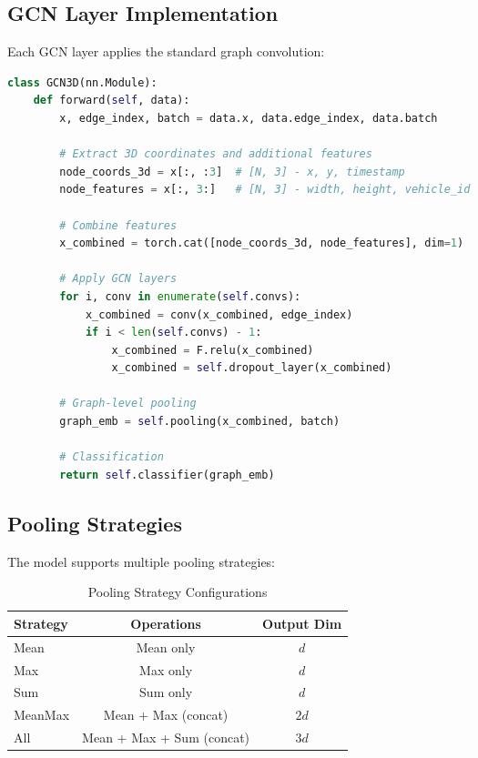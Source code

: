 \subsection{GCN Layer Implementation}

Each GCN layer applies the standard graph convolution:

\begin{lstlisting}[language=Python, caption={GCN layer forward pass}]
class GCN3D(nn.Module):
    def forward(self, data):
        x, edge_index, batch = data.x, data.edge_index, data.batch
        
        # Extract 3D coordinates and additional features
        node_coords_3d = x[:, :3]  # [N, 3] - x, y, timestamp
        node_features = x[:, 3:]   # [N, 3] - width, height, vehicle_id
        
        # Combine features
        x_combined = torch.cat([node_coords_3d, node_features], dim=1)
        
        # Apply GCN layers
        for i, conv in enumerate(self.convs):
            x_combined = conv(x_combined, edge_index)
            if i < len(self.convs) - 1:
                x_combined = F.relu(x_combined)
                x_combined = self.dropout_layer(x_combined)
        
        # Graph-level pooling
        graph_emb = self.pooling(x_combined, batch)
        
        # Classification
        return self.classifier(graph_emb)
\end{lstlisting}

\subsection{Pooling Strategies}

The model supports multiple pooling strategies:

\begin{table}[H]
\centering
\caption{Pooling Strategy Configurations}
\label{tab:pooling_strategies}
\begin{tabular}{lcc}
\toprule
\textbf{Strategy} & \textbf{Operations} & \textbf{Output Dim} \\
\midrule
Mean & Mean only & $d$ \\
Max & Max only & $d$ \\
Sum & Sum only & $d$ \\
MeanMax & Mean + Max (concat) & $2d$ \\
All & Mean + Max + Sum (concat) & $3d$ \\
\bottomrule
\end{tabular}
\end{table}

